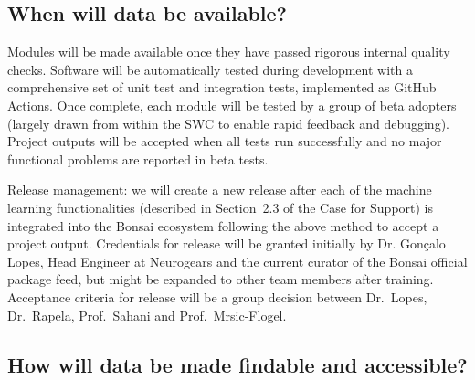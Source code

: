 \documentclass[a4paper,11pt]{article}
\begin{document}
\subsection{When will data be available?}


Modules will be made available once they have passed rigorous internal quality checks.
Software will be automatically tested during development with a comprehensive set of unit test and integration tests, implemented as  GitHub Actions.  Once complete, each 
module will be tested by a group of beta adopters (largely drawn from within the SWC to enable rapid feedback and debugging).  Project outputs will be accepted when all tests run successfully and no major functional problems are reported in beta tests.

Release management: we will create a new release after each of the machine
learning functionalities (described in Section~2.3 of the Case for Support) is
integrated into the Bonsai ecosystem following the above method to accept a
project output. Credentials for release will be granted initially by Dr.
Gonçalo Lopes, Head Engineer at Neurogears and the current curator of the
Bonsai official package feed, but might be expanded to other team members after
training.  Acceptance criteria for release will be a group decision between
Dr.~Lopes, Dr.~Rapela, Prof.~Sahani and Prof.~Mrsic-Flogel.

\subsection{How will data be made findable and accessible?}

\end{document}

